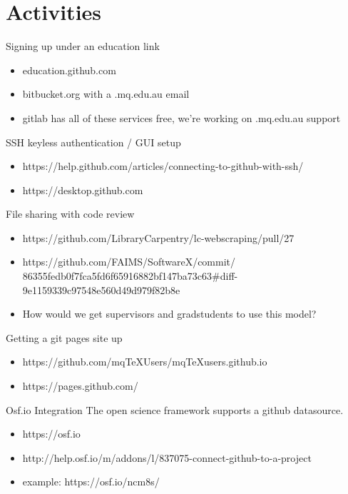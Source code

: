 \documentclass[aspectratio=1610]{beamer} %
\begin{document}
\section{Activities}


\begin{frame}{Signing up under an education link}
  
  \begin{itemize}
    \item education.github.com
    \item bitbucket.org with a .mq.edu.au email
    \item gitlab has all of these services free, we're working on .mq.edu.au support
  \end{itemize}
\end{frame}


\begin{frame}{SSH keyless authentication / GUI setup}
  
  \begin{itemize}
    \item https://help.github.com/articles/connecting-to-github-with-ssh/
    \item https://desktop.github.com
  \end{itemize}
\end{frame}

\begin{frame}{File sharing with code review}
  
  \begin{itemize}
    \item https://github.com/LibraryCarpentry/lc-webscraping/pull/27
    \item https://github.com/FAIMS/SoftwareX/commit/\\86355fedb0f7fca5fd6f65916882bf147ba73c63\#diff-9e1159339c97548e560d49d979f82b8e
    \item How would we get supervisors and gradstudents to use this model?
  \end{itemize}
\end{frame}

\begin{frame}{Getting a git pages site up}
  
  \begin{itemize}
    \item https://github.com/mqTeXUsers/mqTeXusers.github.io
    \item https://pages.github.com/
  \end{itemize}
\end{frame}

\begin{frame}{Osf.io Integration}
  The open science framework supports a github datasource.
  \begin{itemize}
    \item https://osf.io
    \item http://help.osf.io/m/addons/l/837075-connect-github-to-a-project
    \item example: https://osf.io/ncm8s/
  \end{itemize}
\end{frame}
\end{document}

